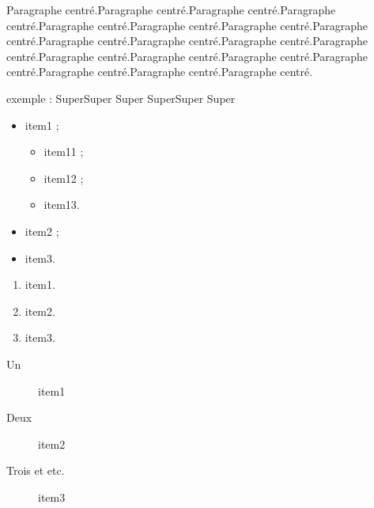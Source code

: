 \documentclass{report}
\begin{document}
\begin{center}%
Paragraphe centré.Paragraphe centré.Paragraphe centré.Paragraphe centré.Paragraphe centré.Paragraphe centré.Paragraphe centré.Paragraphe centré.Paragraphe centré.Paragraphe centré.Paragraphe centré.Paragraphe centré.Paragraphe centré.Paragraphe centré.Paragraphe centré.Paragraphe centré.Paragraphe centré.Paragraphe centré.Paragraphe centré.
\end{center}


exemple :
Super\hfill Super \hfill Super%
Super\vfill Super \vfill Super%

%

\begin{itemize}
\item item1 ;
\begin{itemize}
\item item11 ;
\item item12 ;
\item item13.
\end{itemize}
\item item2 ;
\item item3.
\end{itemize}

\begin{enumerate}
\item item1.
\item item2.
\item item3.
\end{enumerate}

\begin{description}
\item[Un] item1
\item[Deux] item2
\item[Trois et etc.] item3
\end{description}
\end{document}
